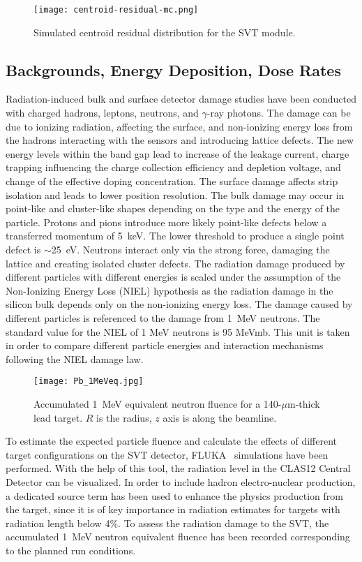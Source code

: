 \begin{figure}[hbt]
\texttt{[image: centroid-residual-mc.png]}
\caption{Simulated centroid residual distribution for the SVT module.}
\label{fig:centroid-residual-mc}
\end{figure}

\subsection{Backgrounds, Energy Deposition, Dose Rates}

Radiation-induced bulk and surface detector damage studies have been conducted with charged hadrons, leptons, neutrons, and $\gamma$-ray photons. The damage can be due to ionizing radiation, affecting the surface, and non-ionizing energy loss from the hadrons interacting with the sensors and introducing lattice defects. The new energy levels within the band gap lead to increase of the leakage current, charge trapping influencing the charge collection efficiency and depletion voltage, and change of the effective doping concentration. The surface damage affects strip isolation and leads to lower position resolution. The bulk damage may occur in point-like and cluster-like shapes depending on the type and the energy of the particle. Protons and pions introduce more likely point-like defects below a transferred momentum of 5~keV. The lower threshold to produce a single point defect is $\sim$25~eV\cite{ROHE}. Neutrons interact only via the strong force, damaging the lattice and creating isolated cluster defects. The radiation damage produced by different particles with different energies is scaled under the assumption of the Non-Ionizing Energy Loss (NIEL) hypothesis as the radiation damage in the silicon bulk depends only on the non-ionizing energy loss. The damage caused by different particles is referenced to the damage from 1~MeV neutrons. The standard value for the NIEL of 1 MeV neutrons is 95 MeVmb. This unit is taken in order to compare different particle energies and interaction mechanisms following the NIEL damage law.

\begin{figure}[hbt] 
\texttt{[image: Pb\_1MeVeq.jpg]}
\caption{Accumulated 1~MeV equivalent neutron fluence for a 140-$\mu$m-thick lead target. $R$ is the radius, $z$ axis is along the beamline.}
\label{fig:fluka1}
\end{figure}

To estimate the expected particle fluence and calculate the effects of different target configurations on the SVT detector,  FLUKA~\cite{FLUKA1, FLUKA2} simulations have been performed. With the help of this tool, the radiation level in the CLAS12 Central Detector can be visualized. In order to include hadron electro-nuclear production, a dedicated source term has been used to enhance the physics production from the target, since it is of key importance in radiation estimates for targets with radiation length below 4$\%$. To assess the radiation damage to the SVT, the accumulated 1~MeV neutron equivalent fluence has been recorded corresponding to the planned run conditions. 


